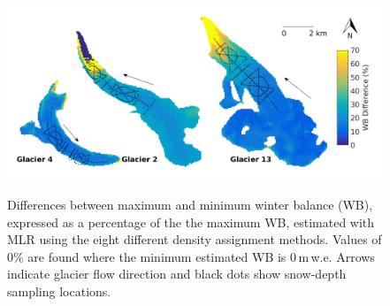 \documentclass{sfuthesis}
\newcommand{\topomap}{Arrows indicate glacier flow direction and black dots show snow-depth sampling locations. }
\begin{document}
{ \begin{figure}[H]
	\centering
	\includegraphics[width =\textwidth]{MLR_SWEdifferenceMap_percent.png}\\
	\caption[Differences between maximum and minimum winter balance (WB), expressed as a percentage of the the maximum WB, estimated with MLR using the eight different density assignment methods]{Differences between maximum and minimum winter balance (WB), expressed as a percentage of the the maximum WB, estimated with MLR using the eight different density assignment methods. Values of 0\% are found where the minimum estimated WB is 0\,m\,w.e. \topomap}
	\label{fig:MLR_SWEdiffMapPercent}
\end{figure}
 


}
\end{document}
